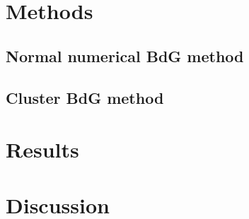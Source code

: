 \documentclass[11pt,twocolumn]{article}
\begin{document}
\section{Methods}\label{sec:methods}
\subsection{Normal numerical BdG method}
\subsection{Cluster BdG method}

\section{Results}\label{sec:results}

\section{Discussion}\label{sec:discussion}


\onecolumn
\end{document}
